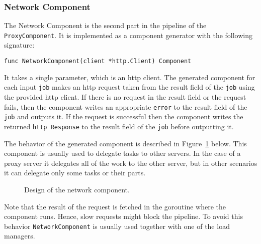 \subsubsection{Network Component}
The Network Component is the second part in the pipeline of the 
\texttt{ProxyComponent}. It is implemented as a component generator 
with the following signature:
\begin{lstlisting}
func NetworkComponent(client *http.Client) Component
\end{lstlisting}
It takes a single parameter, which is an http client.
The generated component for each input \texttt{job} makes an http request 
taken from the result field of the \texttt{job} using the 
provided http client.
If there is no request in the result field or the request fails, then
the component writes an appropriate \texttt{error} to the result field of the
\texttt{job} and outputs it. If the request is successful then 
the component writes the returned \texttt{http Response} to the 
result field of the \texttt{job} before outputting it.

The behavior of the generated component is described in 
Figure~\ref{fig:networkComp} below. This component is usually used
to delegate tasks to other servers. In the case of a proxy server
it delegates all of the work to the other server, but in other scenarios
it can delegate only some tasks or their parts.
\begin{figure}[h]
\centering
{}
\caption[scale=1.0]{Design of the network component.}
\label{fig:networkComp}
\end{figure}

Note that the result of the request is fetched in the goroutine where the
component runs. Hence, slow requests might block the pipeline. To avoid
this behavior \texttt{NetworkComponent} is usually used together with one
of the load managers. 

